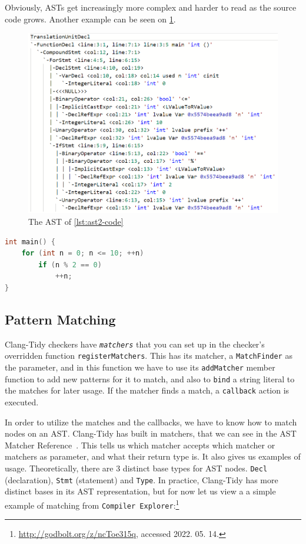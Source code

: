 Obviously, ASTs get increasingly more complex and harder to read as the source code grows. Another example can be seen on \cref{fig:ast2}.
\begin{figure}[H]
    \includegraphics[width=\linewidth]{images/random_ast2.png}
	\caption{The AST of \cref{lst:ast2-code}}
    \label{fig:ast2}
\end{figure}

\begin{lstlisting}[language={C++},caption={The code of \cref{fig:ast2}.},label={lst:ast2-code}]
int main() {
	for (int n = 0; n <= 10; ++n)
		if (n % 2 == 0)
			++n;
}
\end{lstlisting}

\subsection{Pattern Matching}

Clang-Tidy checkers have \emph{\texttt{matchers}} that you can set up in the checker's overridden function \texttt{registerMatchers}.
This has its matcher, a \texttt{MatchFinder} as the parameter, and in this function we have to use its \texttt{addMatcher}
member function to add new patterns for it to match, and also to \texttt{bind} a string literal to the matches for later usage.
If the matcher finds a match, a \texttt{callback} action is executed.

In order to utilize the matches and the callbacks, we have to know how to match nodes on an AST. Clang-Tidy has built in matchers,
that we can see in the AST Matcher Reference~\cite{matcherref}. This tells us which matcher accepts which matcher or matchers as
parameter, and what their return type is. It also gives us examples of usage.
Theoretically, there are 3 distinct base types for AST nodes. \texttt{Decl} (declaration), \texttt{Stmt} (statement) and \texttt{Type}. In practice,
Clang-Tidy has more distinct bases in its AST representation, but for now let us view a a simple example of matching from
\texttt{Compiler Explorer}:\footnote{\url{http://godbolt.org/z/ncToe315q}, accessed 2022. 05. 14.}

